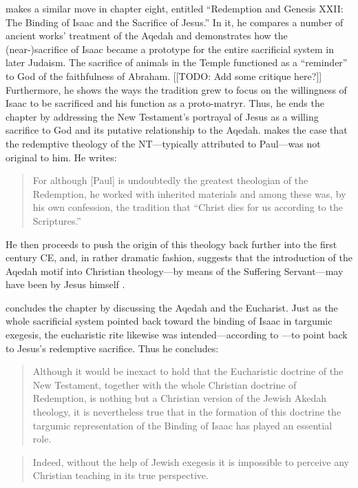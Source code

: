  \vermes makes a similar move in chapter eight, entitled ``Redemption and Genesis XXII: The Binding of Isaac and the Sacrifice of Jesus.'' In it, he compares a number of ancient works' treatment of the Aqedah and demonstrates how the (near-)sacrifice of Isaac became a prototype for the entire sacrificial system in later Judaism. The sacrifice of animals in the Temple functioned as a ``reminder'' to God of the faithfulness of Abraham. [[TODO: Add some critique here?]] Furthermore, he shows the ways the tradition grew to focus on the willingness of Isaac to be sacrificed and his function as a proto-matryr. Thus, he ends the chapter by addressing the New Testament's portrayal of Jesus as a willing sacrifice to God and its putative relationship to the Aqedah. \vermes makes the case that the redemptive theology of the NT---typically attributed to Paul---was not original to him. He writes: 

 \begin{quote} For although {[}Paul{]} is undoubtedly the greatest theologian of the Redemption, he worked with inherited materials and among these was, by his own confession, the tradition that ``Christ dies for us according to the Scriptures.''\autocite[221]{vermes1961} \end{quote} 

 He then proceeds to push the origin of this theology back further into the first century CE, and, in rather dramatic fashion, suggests that the introduction of the Aqedah motif into Christian theology---by means of the Suffering Servant---may have been by Jesus himself \autocite[223]{vermes1961}. 

 \vermes concludes the chapter by discussing the Aqedah and the Eucharist. Just as the whole sacrificial system pointed back toward the binding of Isaac in targumic exegesis, the eucharistic rite likewise was intended---according to \vermes---to point back to Jesus's redemptive sacrifice. Thus he concludes: 

 \begin{quote} Although it would be inexact to hold that the Eucharistic doctrine of the New Testament, together with the whole Christian doctrine of Redemption, is nothing but a Christian version of the Jewish Akedah theology, it is nevertheless true that in the formation of this doctrine the targumic representation of the Binding of Isaac has played an essential role. \end{quote} 

 \begin{quote} Indeed, without the help of Jewish exegesis it is impossible to perceive any Christian teaching in its true perspective.\autocite[227]{vermes1961} \end{quote} 

